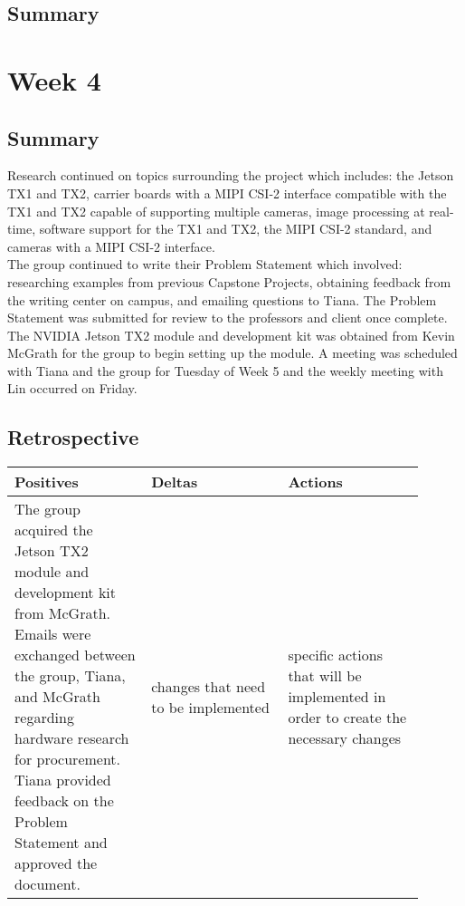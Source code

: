\documentclass[letterpaper,10pt,serif,draftclsnofoot,onecolumn,compsoc,titlepage]{IEEEtran}
\begin{document}
\subsection{Summary}

\section{Week 4}

\subsection{Summary}

Research continued on topics surrounding the project which includes: the Jetson TX1 and 
TX2, carrier boards with a MIPI CSI-2 interface compatible with the TX1 and TX2 
capable of supporting multiple cameras, image processing at real-time, software support 
for the TX1 and TX2, the MIPI CSI-2 standard, and cameras with a MIPI CSI-2 interface. \\

The group continued to write their Problem Statement which involved: researching 
examples from previous Capstone Projects, obtaining feedback from the writing center 
on campus, and emailing questions to Tiana. 
The Problem Statement was submitted for review to the professors and client once 
complete. \\

The NVIDIA Jetson TX2 module and development kit was obtained from Kevin McGrath for 
the group to begin setting up the module.
A meeting was scheduled with Tiana and the group for Tuesday of Week 5 and the weekly 
meeting with Lin occurred on Friday.\\

\subsection{Retrospective}

\begin{tabular}{|p{0.3\linewidth}|p{0.3\linewidth}|p{0.3\linewidth}|}
   \hline
   \textbf{Positives} & \textbf{Deltas} & \textbf{Actions}\\ 
   \hline
   The group acquired the Jetson TX2 module and development kit from McGrath. 
   Emails were exchanged between the group, Tiana, and McGrath regarding hardware 
   research for procurement. Tiana provided feedback on the Problem Statement 
   and approved the document. 
   & 
   changes that need to be implemented 
   & 
   specific actions that will be implemented in order to create the necessary 
   changes \\
   \hline
\end{tabular}
\end{document}
